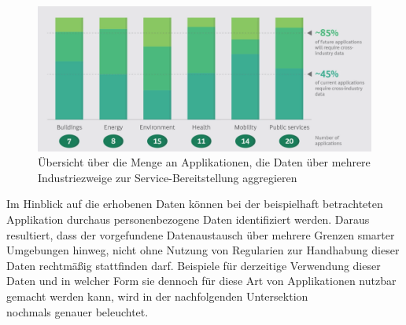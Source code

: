 \begin{figure}[bp!]
    \centering
    \includegraphics[scale=0.2]{main/pictures/smart_city/Smart_City_Apps_Data_Req}
    \caption{Übersicht über die Menge an Applikationen, die Daten über mehrere Industriezweige zur Service-Bereitstellung aggregieren \cite{BCG2020}}
    \label{fig:data-aggregation-smart-city-apps}
\end{figure}

\noindent Im Hinblick auf die erhobenen Daten können bei der beispielhaft betrachteten Applikation durchaus personenbezogene Daten identifiziert werden. Daraus resultiert, dass der vorgefundene Datenaustausch über mehrere Grenzen smarter Umgebungen hinweg, nicht ohne Nutzung von Regularien zur Handhabung dieser Daten rechtmäßig stattfinden darf. Beispiele für derzeitige Verwendung dieser Daten und in welcher Form sie dennoch für diese Art von Applikationen nutzbar gemacht werden kann, wird in der nachfolgenden Untersektion \\  nochmals genauer beleuchtet.

